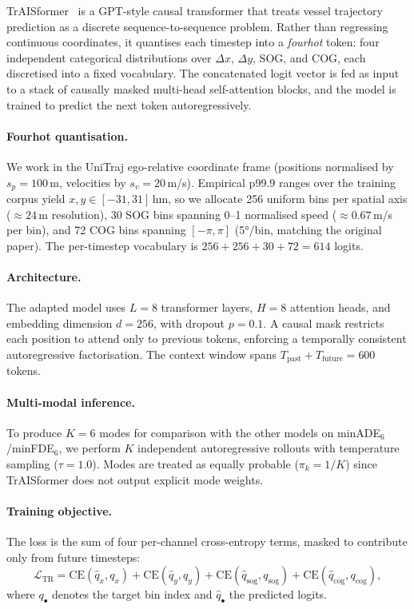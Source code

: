 \documentclass[12pt, a4paper]{article}
\begin{document}
TrAISformer~\citep{nguyen2021traisformer} is a GPT-style causal
transformer that treats vessel trajectory prediction as a discrete
sequence-to-sequence problem.  Rather than regressing continuous
coordinates, it quantises each timestep into a \emph{fourhot} token:
four independent categorical distributions over $\Delta x$, $\Delta y$,
SOG, and COG, each discretised into a fixed vocabulary.  The
concatenated logit vector is fed as input to a stack of causally masked
multi-head self-attention blocks, and the model is trained to predict the
next token autoregressively.

\paragraph{Fourhot quantisation.}
We work in the UniTraj ego-relative coordinate frame (positions
normalised by $s_p = 100$\,m, velocities by $s_v = 20$\,m/s).
Empirical p99.9 ranges over the training corpus yield
$x, y \in [-31, 31]$\,hm, so we allocate 256 uniform bins per
spatial axis ($\approx 24$\,m resolution), 30 SOG bins spanning
0--1 normalised speed ($\approx 0.67$\,m/s per bin), and 72 COG bins
spanning $[-\pi, \pi]$ (5°/bin, matching the original paper).
The per-timestep vocabulary is $256 + 256 + 30 + 72 = 614$ logits.

\paragraph{Architecture.}
The adapted model uses $L=8$ transformer layers, $H=8$ attention heads,
and embedding dimension $d=256$, with dropout $p=0.1$.
A causal mask restricts each position to attend only to previous tokens,
enforcing a temporally consistent autoregressive factorisation.
The context window spans $T_{\text{past}} + T_{\text{future}} = 600$
tokens.

\paragraph{Multi-modal inference.}
To produce $K=6$ modes for comparison with the other models on
minADE$_6$/minFDE$_6$, we perform $K$ independent autoregressive rollouts
with temperature sampling ($\tau = 1.0$).
Modes are treated as equally probable ($\pi_k = 1/K$) since TrAISformer
does not output explicit mode weights.

\paragraph{Training objective.}
The loss is the sum of four per-channel cross-entropy terms, masked to
contribute only from future timesteps:
\begin{equation}
  \mathcal{L}_{\text{TR}} =
  \text{CE}(\hat{q}_x, q_x) + \text{CE}(\hat{q}_y, q_y) +
  \text{CE}(\hat{q}_{\text{sog}}, q_{\text{sog}}) +
  \text{CE}(\hat{q}_{\text{cog}}, q_{\text{cog}}),
  \label{eq:traisformer_loss}
\end{equation}
where $q_{\bullet}$ denotes the target bin index and $\hat{q}_{\bullet}$
the predicted logits.
\end{document}
